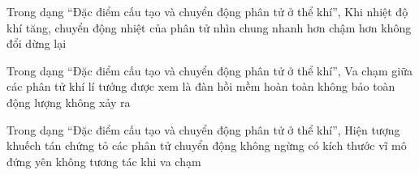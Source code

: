 \begin{ex}
Trong dạng “Đặc điểm cấu tạo và chuyển động phân tử ở thể khí”, Khi nhiệt độ khí tăng, chuyển động nhiệt của phân tử nhìn chung
\choice
{\True nhanh hơn}
{chậm hơn}
{không đổi}
{dừng lại}
\end{ex}

\begin{ex}
Trong dạng “Đặc điểm cấu tạo và chuyển động phân tử ở thể khí”, Va chạm giữa các phân tử khí lí tưởng được xem là
\choice
{\True đàn hồi}
{mềm hoàn toàn}
{không bảo toàn động lượng}
{không xảy ra}
\end{ex}

\begin{ex}
Trong dạng “Đặc điểm cấu tạo và chuyển động phân tử ở thể khí”, Hiện tượng khuếch tán chứng tỏ các phân tử
\choice
{\True chuyển động không ngừng}
{có kích thước vĩ mô}
{đứng yên}
{không tương tác khi va chạm}
\end{ex}
